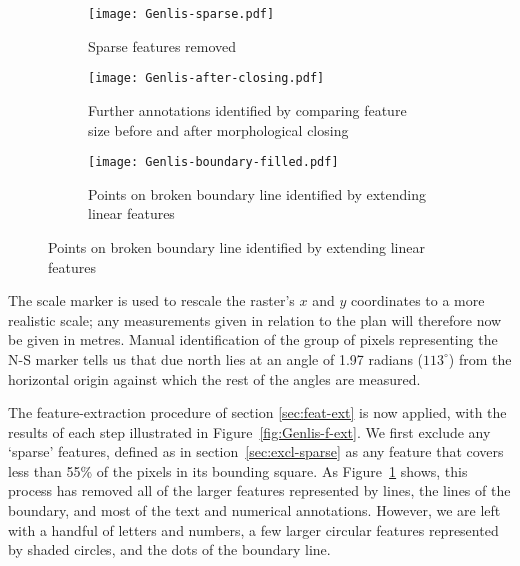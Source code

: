 \documentclass[../../ArchStats.tex]{subfiles}
\begin{document}
\begin{figure}[!ht]
\centering
\caption{Stages of post-hole feature identification process for the Genlis site plan. After data cleaning, 243 post-hole features remain.}
\label{fig:Genlis-f-ext}
%
\begin{subfigure}[b]{0.9\textwidth}
\caption{Sparse features removed}
\label{fig:Genlis-f-ext-sparse-removed}
\centering
\texttt{[image: Genlis-sparse.pdf]}
\end{subfigure}
\vspace{10pt}

\begin{subfigure}[b]{0.9\textwidth}
\caption{Further annotations identified by comparing feature size before and after morphological closing}
\label{fig:Genlis-f-ext-closed}
\centering
\texttt{[image: Genlis-after-closing.pdf]}
\end{subfigure}

\vspace{10pt}
\begin{subfigure}[b]{0.9\textwidth}
\caption{Points on broken boundary line identified by extending linear features}
\label{fig:Genlis-f-ext-boundary}
\centering
\texttt{[image: Genlis-boundary-filled.pdf]}
\end{subfigure}
\end{figure}

The scale marker is used to rescale the raster's $x$ and $y$ coordinates to a more realistic scale; any measurements given in relation to the plan will therefore now be given in metres. Manual identification of the group of pixels representing the N-S marker tells us that due north lies at an angle of 1.97 radians ($113^\circ$) from the horizontal origin against which the rest of the angles are measured.

The feature-extraction procedure of section \ref{sec:feat-ext} is now applied, with the results of each step illustrated in Figure~\ref{fig:Genlis-f-ext}. We first  exclude any `sparse' features, defined as in section~\ref{sec:excl-sparse} as any feature that covers less than 55\% of the pixels in its bounding square. As Figure~\ref{fig:Genlis-f-ext-sparse-removed} shows, this process has removed all of the larger features represented by lines, the lines of the boundary, and most of the text and numerical annotations.  However, we are left with a handful of letters and numbers, a few larger circular features represented by shaded circles, and the dots of the boundary line.
\end{document}
